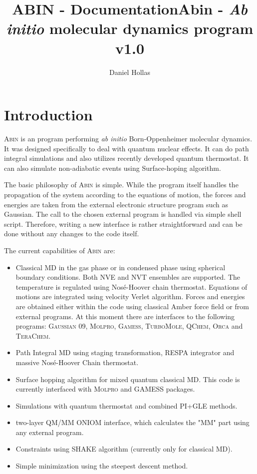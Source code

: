 \documentclass[12pt,a4paper]{article}
\author{Daniel Hollas}
\title{ABIN - Documentation}
\title{Abin -  \textit{Ab initio} molecular dynamics program \\ v1.0}
\begin{document}
\maketitle

\newcommand{\abin}{\textsc{Abin} }

\tableofcontents
\newpage

\section{Introduction}
\abin is an program performing \textit{ab initio} Born-Oppenheimer molecular dynamics. It was designed specifically to deal with quantum nuclear effects. It can do path integral simulations and also utilizes recently developed quantum thermostat\cite{Ceriotti2011}.
It can also simulate non-adiabatic events using Surface-hoping algorithm.   

The basic philosophy of \abin is simple. While the program itself handles the propagation of the system according to the equations of motion, the forces and energies are taken from the external electronic structure program such as Gaussian. The call to the chosen external program is handled via simple shell script. Therefore, writing a new interface is rather straightforward and can be done without any changes to the code itself.

The current capabilities of \abin are:
\begin{itemize}
\item Classical MD in the gas phase or in condensed phase using spherical boundary conditions. Both NVE and NVT ensembles are supported. The temperature is regulated using Nosé-Hoover chain thermostat\cite{Martyna1992a}. Equations of motions are integrated using velocity Verlet algorithm. Forces and energies are obtained either within the code using classical Amber force field or from external programs. 
At this moment there are interfaces to the following programs: \textsc{Gaussian 09\cite{G09}}, \textsc{Molpro}\cite{MOLPRO06}, \textsc{Gamess}\cite{Schmidt1993}, \textsc{TurboMole}\cite{turbomole}, \textsc{QChem}\cite{Shao2006}, \textsc{Orca}\cite{orca} and \textsc{TeraChem}\cite{Ufimtsev2009}. 

\item Path Integral MD using staging transformation, RESPA integrator and massive Nosé-Hoover Chain thermostat.
\item Surface hopping algorithm\cite{Barbatti2011} for mixed quantum classical MD. This code is currently interfaced with \textsc{Molpro} and \textsc{GAMESS} packages. 
\item Simulations with quantum thermostat\cite{Ceriotti2010d} and combined PI+GLE\cite{Ceriotti2011} methods.
\item two-layer QM/MM ONIOM interface, which calculates the "MM" part using any external program.
\item Constraints using SHAKE algorithm (currently only for classical MD).
\item Simple minimization using the steepest descent method. 
\end{itemize} 
\end{document}
